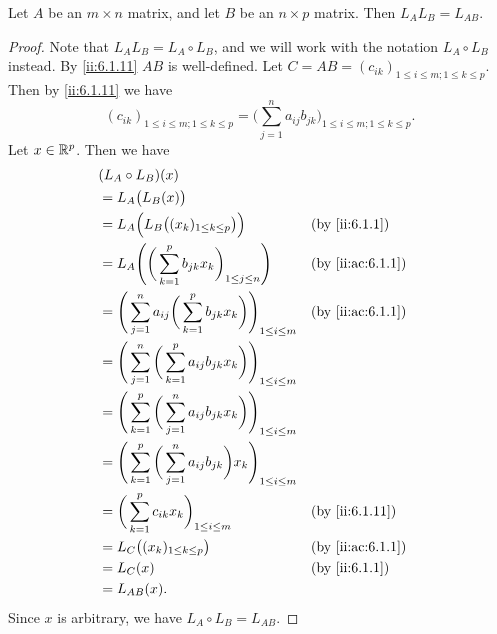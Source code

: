 \begin{lem}\label{ii:6.1.16}
  Let \(A\) be an \(m \times n\) matrix, and let \(B\) be an \(n \times p\) matrix.
  Then \(L_A L_B = L_{AB}\).
\end{lem}

\begin{proof}
  Note that \(L_A L_B = L_A \circ L_B\), and we will work with the notation \(L_A \circ L_B\) instead.
  By \cref{ii:6.1.11} \(AB\) is well-defined.
  Let \(C = AB = (c_{ik})_{1 \leq i \leq m ; 1 \leq k \leq p}\).
  Then by \cref{ii:6.1.11} we have
  \[
    (c_{ik})_{1 \leq i \leq m ; 1 \leq k \leq p} = \bigg(\sum_{j = 1}^n a_{ij} b_{jk}\bigg)_{1 \leq i \leq m ; 1 \leq k \leq p}.
  \]
  Let \(x \in \mathbb{R}^p\).
  Then we have
  \begin{align*}
     & (L_A \circ L_B)(x)                                                                                                \\
     & = L_A\big(L_B(x)\big)                                                                                             \\
     & = L_A\Big(L_B\big((x_k)_{1 \leq k \leq p}\big)\Big)                                         &  & \by{ii:6.1.1}    \\
     & = L_A\Bigg(\bigg(\sum_{k = 1}^p b_{jk} x_k\bigg)_{1 \leq j \leq n}\Bigg)                    &  & \by{ii:ac:6.1.1} \\
     & = \Bigg(\sum_{j = 1}^n a_{ij} \bigg(\sum_{k = 1}^p b_{jk} x_k\bigg)\Bigg)_{1 \leq i \leq m} &  & \by{ii:ac:6.1.1} \\
     & = \Bigg(\sum_{j = 1}^n \bigg(\sum_{k = 1}^p a_{ij} b_{jk} x_k\bigg)\Bigg)_{1 \leq i \leq m}                       \\
     & = \Bigg(\sum_{k = 1}^p \bigg(\sum_{j = 1}^n a_{ij} b_{jk} x_k\bigg)\Bigg)_{1 \leq i \leq m}                       \\
     & = \Bigg(\sum_{k = 1}^p \bigg(\sum_{j = 1}^n a_{ij} b_{jk}\bigg) x_k\Bigg)_{1 \leq i \leq m}                       \\
     & = \bigg(\sum_{k = 1}^p c_{ik} x_k\bigg)_{1 \leq i \leq m}                                   &  & \by{ii:6.1.11}   \\
     & = L_C\big((x_k)_{1 \leq k \leq p}\big)                                                      &  & \by{ii:ac:6.1.1} \\
     & = L_C(x)                                                                                    &  & \by{ii:6.1.1}    \\
     & = L_{AB}(x).
  \end{align*}
  Since \(x\) is arbitrary, we have \(L_A \circ L_B = L_{AB}\).
\end{proof}

